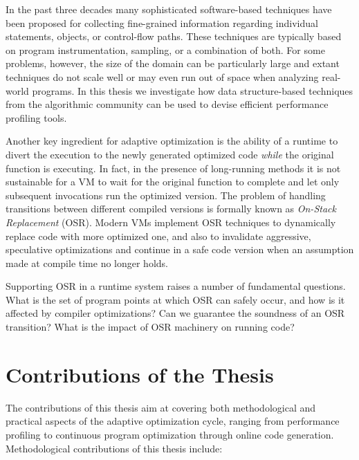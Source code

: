 In the past three decades many sophisticated software-based techniques have been proposed for collecting fine-grained information regarding individual statements, objects, or control-flow paths. These techniques are typically based on program instrumentation, sampling, or a combination of both. For some problems, however, the size of the domain can be particularly large and extant techniques do not scale well or may even run out of space when analyzing real-world programs. In this thesis we investigate how data structure-based techniques from the algorithmic community can be used to devise efficient performance profiling tools. %


Another key ingredient for adaptive optimization is the ability of a runtime to divert the execution to the newly generated optimized code {\em while} the original function is executing. In fact, in the presence of long-running methods it is not sustainable for a VM to wait for the original function to complete and let only subsequent invocations run the optimized version. The problem of handling transitions between different compiled versions is formally known as {\em On-Stack Replacement} (OSR). Modern VMs implement OSR techniques to dynamically replace code with more optimized one, and also to invalidate aggressive, speculative optimizations and continue in a safe code version when an assumption made at compile time no longer holds.

\noindent Supporting OSR in a runtime system raises a number of fundamental questions. What is the set of program points at which OSR can safely occur, and how is it affected by compiler optimizations? Can we guarantee the soundness of an OSR transition? What is the impact of OSR machinery on running code? 

\section{Contributions of the Thesis}

The contributions of this thesis aim at covering both methodological and practical aspects of the adaptive optimization cycle, ranging from performance profiling to continuous program optimization through online code generation. Methodological contributions of this thesis include:

